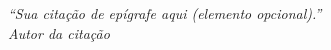 \begin{epigrafe}
    \vspace*{\fill}
	\begin{flushright}
		\textit{``Sua citação de epígrafe aqui (elemento opcional).''\\
		Autor da citação}
	\end{flushright}
\end{epigrafe}
